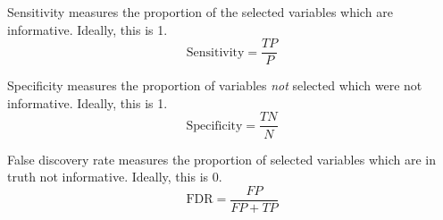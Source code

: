 Sensitivity measures the proportion of the selected variables which are informative.
Ideally, this is 1.
\begin{equation}\label{eq:sensitivity}
    \text{Sensitivity}=\frac{TP}{P}
\end{equation}

Specificity measures the proportion of variables \textit{not} selected which were not informative.
Ideally, this is 1.
\begin{equation}\label{eq:specificity}
    \text{Specificity}=\frac{TN}{N}
\end{equation}

False discovery rate measures the proportion of selected variables which are in truth not informative.
Ideally, this is 0.
\begin{equation}\label{eq:accuracy}
    \text{FDR}=\frac{FP}{FP+TP}
\end{equation}

